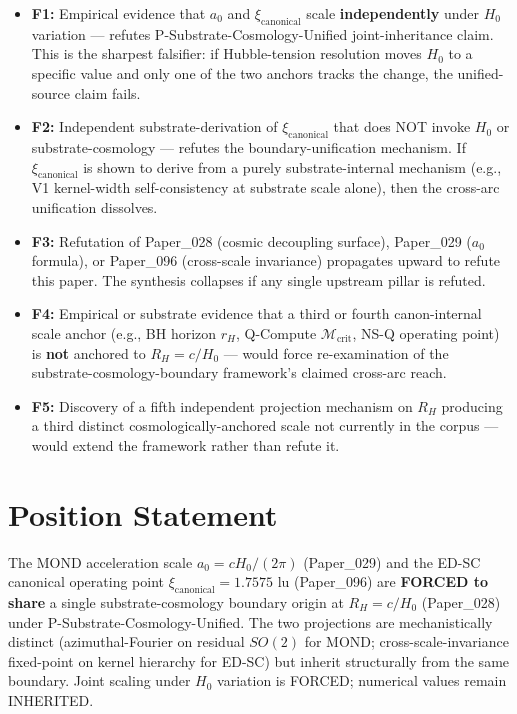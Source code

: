 \documentclass[11pt,a4paper]{article}
\begin{document}
\begin{itemize}[noitemsep]
\item \textbf{F1:} Empirical evidence that $a_0$ and $\xi_\mathrm{canonical}$ scale \textbf{independently} under $H_0$ variation --- refutes P-Substrate-Cosmology-Unified joint-inheritance claim. This is the sharpest falsifier: if Hubble-tension resolution moves $H_0$ to a specific value and only one of the two anchors tracks the change, the unified-source claim fails.
\item \textbf{F2:} Independent substrate-derivation of $\xi_\mathrm{canonical}$ that does NOT invoke $H_0$ or substrate-cosmology --- refutes the boundary-unification mechanism. If $\xi_\mathrm{canonical}$ is shown to derive from a purely substrate-internal mechanism (e.g., V1 kernel-width self-consistency at substrate scale alone), then the cross-arc unification dissolves.
\item \textbf{F3:} Refutation of Paper\_028 (cosmic decoupling surface), Paper\_029 ($a_0$ formula), or Paper\_096 (cross-scale invariance) propagates upward to refute this paper. The synthesis collapses if any single upstream pillar is refuted.
\item \textbf{F4:} Empirical or substrate evidence that a third or fourth canon-internal scale anchor (e.g., BH horizon $r_H$, Q-Compute $\mathcal{M}_\mathrm{crit}$, NS-Q operating point) is \textbf{not} anchored to $R_H = c/H_0$ --- would force re-examination of the substrate-cosmology-boundary framework's claimed cross-arc reach.
\item \textbf{F5:} Discovery of a fifth independent projection mechanism on $R_H$ producing a third distinct cosmologically-anchored scale not currently in the corpus --- would extend the framework rather than refute it.
\end{itemize}

\section{Position Statement}

The MOND acceleration scale $a_0 = cH_0/(2\pi)$ (Paper\_029) and the ED-SC canonical operating point $\xi_\mathrm{canonical} = 1.7575$ lu (Paper\_096) are \textbf{FORCED to share} a single substrate-cosmology boundary origin at $R_H = c/H_0$ (Paper\_028) under P-Substrate-Cosmology-Unified. The two projections are mechanistically distinct (azimuthal-Fourier on residual $SO(2)$ for MOND; cross-scale-invariance fixed-point on kernel hierarchy for ED-SC) but inherit structurally from the same boundary. Joint scaling under $H_0$ variation is FORCED; numerical values remain INHERITED.
\end{document}
